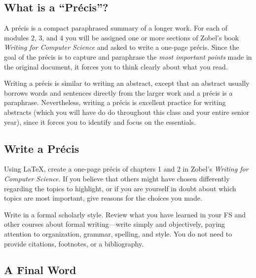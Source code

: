 
\usepackage[compact]{titlesec}




\subsection*{What is a ``Pr\'{e}cis''?}
A pr\'{e}cis is a compact paraphrased summary of a longer work. 
For each of
modules 2, 3, and 4
you will be assigned one or more sections of Zobel's book {\em Writing 
for Computer Science} and asked to write a one-page pr\'{e}cis. 
Since the goal of the pr\'{e}cis is to capture and paraphrase
the {\em most important points} made in the original document, it forces you to think clearly about what you read.

Writing a pr\'{e}cis is similar to writing an abstract, except that an abstract usually borrows words and sentences
directly from the larger work and a pr\'{e}cis is a paraphrase. Nevertheless, writing a pr\'{e}cis is excellent practice
for writing abstracts (which you will have do do throughout this class and your entire senior year), since it forces you
to identify and focus on the essentials.

\subsection*{Write a Pr\'{e}cis}

Using \LaTeX, create a one-page pr\'{e}cis of chapters 1 and 2 in Zobel's {\em Writing for Computer Science.} If you
believe that others might have chosen differently regarding the topics to highlight, or if you are yourself in doubt
about which topics are most important, give reasons for the choices you made.

Write in a formal
scholarly style. Review what you have learned in your FS and other courses
about formal writing---write simply and objectively, paying attention to
organization, grammar, spelling, and style. You do not need to provide 
citations, footnotes, or a bibliography.

\subsection*{A Final Word}

